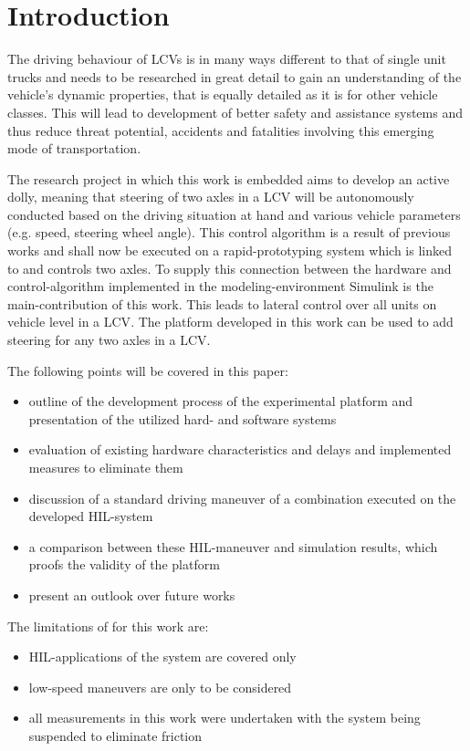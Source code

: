\documentclass[root.tex]{subfiles}
\begin{document}
{\pagestyle{empty}}
\section{Introduction}
\label{chap:introduction}
The driving behaviour of \glspl{LCV} is in many ways different to that of single unit trucks and needs to be researched in great detail to gain an understanding of the vehicle's dynamic properties, that is equally detailed as it is for other vehicle classes. This will lead to development of better safety and assistance systems and thus reduce threat potential, accidents and fatalities involving this emerging mode of transportation.\cite{performance_improvement}

The research project in which this work is embedded aims to develop an active dolly\cite{islam2015inverse, islam2015improve}, meaning that steering of two axles in a \gls{LCV} will be autonomously conducted based on the driving situation at hand and various vehicle parameters (e.g. speed, steering wheel angle). 
This control algorithm is a result of previous works and shall now be executed on a rapid-prototyping system which is linked to and controls two axles. To supply this connection between the hardware and control-algorithm implemented in the modeling-environment Simulink is the main-contribution of this work. This leads to lateral control over all units on vehicle level in a \gls{LCV}. The platform developed in this work can be used to add steering for any two axles in a \gls{LCV}.



The following points will be covered in this paper:
\begin{itemize}
	\item outline of the development process of the experimental platform and presentation of the utilized hard- and software systems 
	\item evaluation of existing hardware characteristics and delays and implemented measures to eliminate them
	\item discussion of a standard driving maneuver of a combination executed on the  developed \gls{HIL}-system 
	\item a comparison between these \gls{HIL}-maneuver and simulation results, which proofs the validity of the platform
	\item present an outlook over future works
\end{itemize}

The limitations of for this work are: 

\begin{itemize}
	\item \gls{HIL}-applications of the system are covered only
	\item low-speed maneuvers are only to be considered
	\item all measurements in this work were undertaken with the system being suspended to eliminate friction
\end{itemize}
\end{document}
